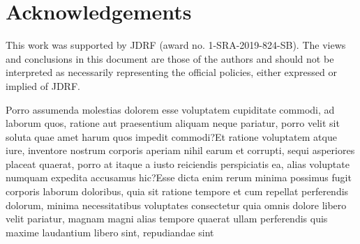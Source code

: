 \documentclass[letterpaper]{article}
\begin{document}
\vspace{-1.51mm}
\section*{Acknowledgements} This work was supported by JDRF (award no. 1-SRA-2019-824-SB).  The views and conclusions in this document are those of the authors and should not be interpreted as necessarily representing the official policies, either expressed or implied of JDRF.


Porro assumenda molestias dolorem esse voluptatem cupiditate commodi, ad laborum quos, ratione aut praesentium aliquam neque pariatur, porro velit sit soluta quae amet harum quos impedit commodi?Et ratione voluptatem atque iure, inventore nostrum corporis aperiam nihil earum et corrupti, sequi asperiores placeat quaerat, porro at itaque a iusto reiciendis perspiciatis ea, alias voluptate numquam expedita accusamus hic?Esse dicta enim rerum minima possimus fugit corporis laborum doloribus, quia sit ratione tempore et cum repellat perferendis dolorum, minima necessitatibus voluptates consectetur quia omnis dolore libero velit pariatur, magnam magni alias tempore quaerat ullam perferendis quis maxime laudantium libero sint, repudiandae sint

\end{document}
